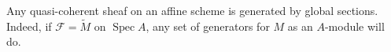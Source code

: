 Any quasi-coherent sheaf on an affine scheme is generated by global sections. Indeed, if $\mathcal{F} = \tilde{M}$ on $\operatorname{Spec} A$, any set of generators for $M$ as an $A$-module will do.
